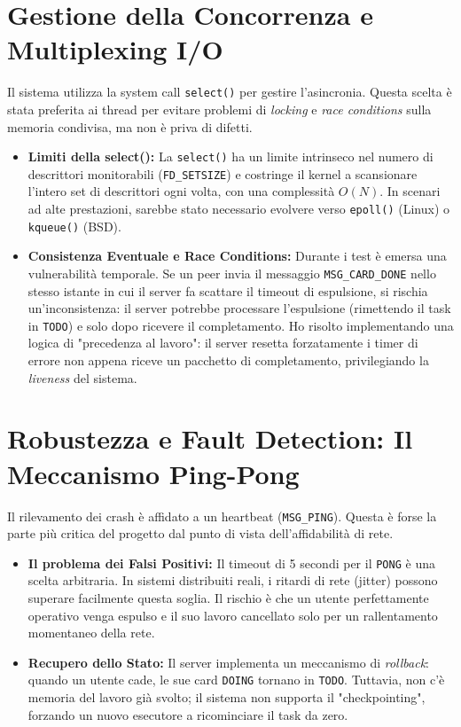 \documentclass[a4paper,11pt]{article}
\begin{document}
\section{Gestione della Concorrenza e Multiplexing I/O}
Il sistema utilizza la system call \texttt{select()} per gestire l'asincronia. Questa scelta è stata preferita ai thread per evitare problemi di \textit{locking} e \textit{race conditions} sulla memoria condivisa, ma non è priva di difetti.

\begin{itemize}[leftmargin=*]
    \item \textbf{Limiti della select():} La \texttt{select()} ha un limite intrinseco nel numero di descrittori monitorabili (\texttt{FD\_SETSIZE}) e costringe il kernel a scansionare l'intero set di descrittori ogni volta, con una complessità $O(N)$. In scenari ad alte prestazioni, sarebbe stato necessario evolvere verso \texttt{epoll()} (Linux) o \texttt{kqueue()} (BSD).
    \item \textbf{Consistenza Eventuale e Race Conditions:} Durante i test è emersa una vulnerabilità temporale. Se un peer invia il messaggio \texttt{MSG\_CARD\_DONE} nello stesso istante in cui il server fa scattare il timeout di espulsione, si rischia un'inconsistenza: il server potrebbe processare l'espulsione (rimettendo il task in \texttt{TODO}) e solo dopo ricevere il completamento. Ho risolto implementando una logica di "precedenza al lavoro": il server resetta forzatamente i timer di errore non appena riceve un pacchetto di completamento, privilegiando la \textit{liveness} del sistema.
\end{itemize}

\section{Robustezza e Fault Detection: Il Meccanismo Ping-Pong}
Il rilevamento dei crash è affidato a un heartbeat (\texttt{MSG\_PING}). Questa è forse la parte più critica del progetto dal punto di vista dell'affidabilità di rete.

\begin{itemize}[leftmargin=*]
    \item \textbf{Il problema dei Falsi Positivi:} Il timeout di 5 secondi per il \texttt{PONG} è una scelta arbitraria. In sistemi distribuiti reali, i ritardi di rete (jitter) possono superare facilmente questa soglia. Il rischio è che un utente perfettamente operativo venga espulso e il suo lavoro cancellato solo per un rallentamento momentaneo della rete. 
    \item \textbf{Recupero dello Stato:} Il server implementa un meccanismo di \textit{rollback}: quando un utente cade, le sue card \texttt{DOING} tornano in \texttt{TODO}. Tuttavia, non c'è memoria del lavoro già svolto; il sistema non supporta il "checkpointing", forzando un nuovo esecutore a ricominciare il task da zero.
\end{itemize}
\end{document}
